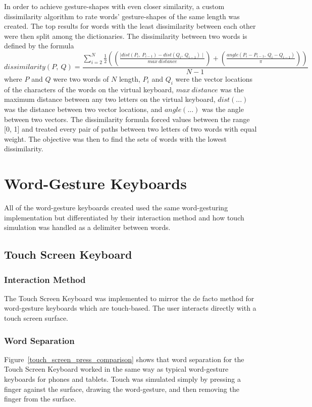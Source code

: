 In order to achieve gesture-shapes with even closer similarity, a custom dissimilarity algorithm to rate words' gesture-shapes of the same length was created. The top results for words with the least dissimilarity between each other were then split among the dictionaries. The dissimilarity between two words is defined by the formula
\begin{equation}
dissimilarity(P,\ Q) = \frac{\sum\limits_{i = 2}^{N} \frac{1}{2} \left(\left(\frac{\mid dist(P_{i},\ P_{i-1}) - dist(Q_{i},\ Q_{i-1})\mid}{max\ distance}\right) + \left(\frac{angle(P_{i} - P_{i-1},\ Q_{i} - Q_{i-1})}{\pi}\right)\right)}{N - 1}
\end{equation}
where $P$ and $Q$ were two words of $N$ length, $P_i$ and $Q_i$ were the vector locations of the characters of the words on the virtual keyboard, $max\ distance$ was the maximum distance between any two letters on the virtual keyboard, $dist(...)$ was the distance between two vector locations, and $angle(...)$ was the angle between two vectors. The dissimilarity formula forced values between the range [0, 1] and treated every pair of paths between two letters of two words with equal weight. The objective was then to find the sets of words with the lowest dissimilarity.

\section{Word-Gesture Keyboards}
All of the word-gesture keyboards created used the same word-gesturing implementation but differentiated by their interaction method and how touch simulation was handled as a delimiter between words.

\subsection{Touch Screen Keyboard}
\subsubsection{Interaction Method}
The Touch Screen Keyboard was implemented to mirror the de facto method for word-gesture keyboards which are touch-based. The user interacts directly with a touch screen surface.

\subsubsection{Word Separation}
Figure~\ref{touch_screen_press_comparison} shows that word separation for the Touch Screen Keyboard worked in the same way as typical word-gesture keyboards for phones and tablets. Touch was simulated simply by pressing a finger against the surface, drawing the word-gesture, and then removing the finger from the surface.

